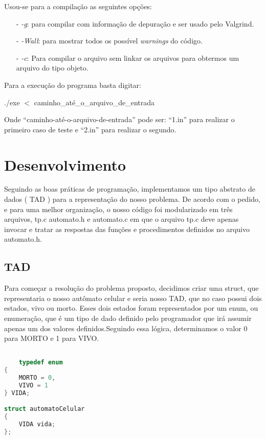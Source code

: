 \documentclass{article}
\begin{document}
Usou-se para a compilação as seguintes opções:

\begin{itemize}
    \item [-] \emph{-g}: para compilar com informação de depuração e ser usado pelo Valgrind.
    \item [-] \emph{-Wall}: para mostrar todos os possível \emph{warnings} do código.
    \item [-] \emph{-c}: Para compilar o arquivo sem linkar os arquivos para obtermos um arquivo do tipo objeto.
\end{itemize}

Para a execução do programa basta digitar:
\begin{tcolorbox}[title=,width=\linewidth]
    ./exe $<$ caminho\_até\_o\_arquivo\_de\_entrada
\end{tcolorbox}

Onde “caminho-até-o-arquivo-de-entrada” pode ser: “1.in” para realizar o primeiro caso de teste e “2.in” para realizar o segundo.

\clearpage



\section{Desenvolvimento}

Seguindo as boas práticas de programação, implementamos um tipo abstrato de dados ( TAD ) para a representação do nosso problema. De acordo com o pedido, e para uma melhor organização, o nosso código foi modularizado em três arquivos, tp.c automato.h e automato.c em que o arquivo tp.c deve apenas invocar e tratar as respostas das funções e procedimentos definidos no arquivo automato.h.

\subsection{TAD}
Para começar a resolução do problema proposto, decidimos criar uma struct, que representaria o nosso autômato celular e seria nosso TAD, que no caso possui dois estados, vivo ou morto. Esses dois estados foram representados por um enum, ou enumeração, que é um tipo de dado definido pelo programador que irá assumir apenas um dos valores definidos.Seguindo essa lógica, determinamos o valor 0 para MORTO e 1 para VIVO.

\begin{lstlisting}[caption={TAD representando um automato celular},label={lst:cod1},language=C]

    typedef enum
{
    MORTO = 0,
    VIVO = 1
} VIDA;

struct automatoCelular
{
    VIDA vida;
};

\end{lstlisting}
\end{document}
